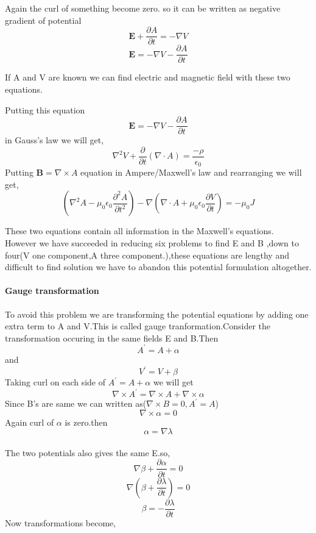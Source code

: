 Again the curl of something become zero. so it can be written as negative gradient of potential
$$\mathbf{E}+\frac{\partial A}{\partial t}=-\nabla V$$
$$\mathbf{E}=-\nabla V-\frac{\partial A}{\partial t}$$
\begin{center}
\end{center}
If A and V are known we can find electric and magnetic field with these two equations.

Putting this equation $$\mathbf{E}=-\nabla V-\frac{\partial A}{\partial t}$$  in Gauss's law
we will get,\\
$$\nabla ^2V+\frac{\partial }{\partial t}(\nabla \cdot A)=\frac{-\rho}{\epsilon_{0}}$$
Putting $\mathbf{B}=\nabla\times A$  equation in Ampere/Maxwell's law and rearranging we will get,\\
$$\left( \nabla^2A-\mu_{0}\epsilon_{0}\frac{\partial^2 A}{\partial t^2}\right) -\nabla\left( \nabla \cdot A+\mu_{0}\epsilon_{0}\frac{\partial V}{\partial t}\right) =-\mu_{0} J$$ 

These two equations contain all information in the Maxwell's equations.\\
However we have succeeded in reducing six problems to find E and B ,down to four(V one component,A three component.),these equations are lengthy and difficult to find solution we have to abandon this potential formulation altogether.\\
\paragraph{Gauge transformation}
To avoid this problem we are transforming the potential equations by adding one extra term to A and V.This is called gauge tranformation.Consider the transformation occuring in the same fields E and B.Then\\
$$A^{\prime}=A+\alpha$$ and
$$V^{\prime}=V+\beta$$
Taking curl on each side of $A^{\prime}=A+\alpha$
we will get 
$$\nabla \times A^{\prime}=\nabla \times A+\nabla \times \alpha$$
Since B's are same we can written as($\nabla \times B=0,A^{\prime}=A$) \\
$$\nabla \times \alpha =0$$
Again curl of $\alpha$ is zero.then\\
$$\alpha=\nabla \lambda$$\\
The two potentials also gives the same E.so,\\
$$\nabla \beta +\frac{\partial \alpha }{\partial t}=0$$
$$\nabla\left( \beta+\frac{\partial \lambda}{\partial t}\right) =0$$
$$\beta= -\frac{\partial \lambda}{\partial t}$$
Now transformations become,\\

